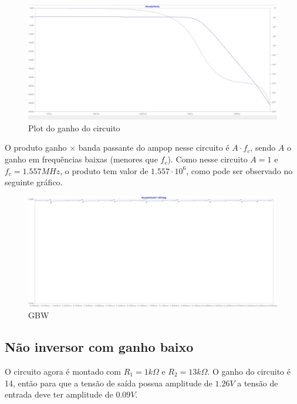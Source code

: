 \documentclass[10pt,twocolumn,letterpaper]{article}
\begin{document}
\begin{figure}[h]
\caption{Plot do ganho do circuito}
\begin{center}
\includegraphics[scale=0.15]{figuras/fig4}
\end{center}
\end{figure}

O produto ganho $\times$ banda passante do ampop nesse circuito é $A\cdot f_c$, sendo $A$ o ganho em frequências baixas (menores que $f_c$). Como nesse circuito $A=1$ e $f_c=1.557MHz$, o produto tem valor de $1.557\cdot10^6$, como pode ser observado no seguinte gráfico.

\begin{figure}[h]
\caption{GBW}
\begin{center}
\includegraphics[scale=0.15]{figuras/fig5}
\end{center}
\end{figure}

\newpage
\subsection{Não inversor com ganho baixo}

O circuito agora é montado com $R_1=1k\Omega$ e $R_2=13k\Omega$. O ganho do circuito é 14, então para que a tensão de saída possua amplitude de $1.26V$ a tensão de entrada deve ter amplitude de $0.09V$.
\end{document}
